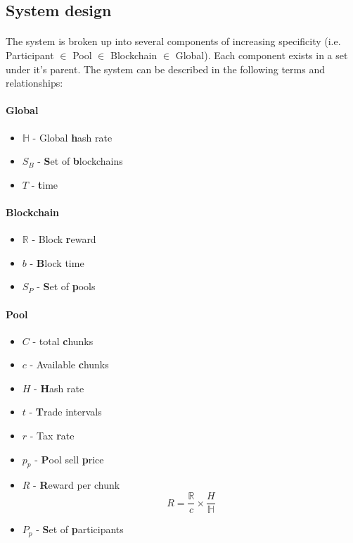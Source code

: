 \subsection{System design}

\paragraph{} The system is broken up into several components of increasing specificity (i.e. Participant $\in$ Pool $\in$ Blockchain $\in$ Global). Each component exists in a set under it's parent. The system can be described in the following terms and relationships:

\paragraph{Global} 

\begin{itemize}
  \item $\mathbb{H}$ - Global \textbf{h}ash rate
  \item $S_B$ - \textbf{S}et of \textbf{b}lockchains
  \item $T$ - \textbf{t}ime
\end{itemize}

\paragraph{Blockchain}

\begin{itemize}
  \item $\mathbb{R}$ - Block \textbf{r}eward
  \item $b$ - \textbf{B}lock time
  \item $S_P$ - \textbf{S}et of \textbf{p}ools
\end{itemize}

\paragraph{Pool}

\begin{itemize}
  \item $C$ - total \textbf{c}hunks
  \item $c$ - Available \textbf{c}hunks
  \item $H$ - \textbf{H}ash rate
  \item $t$ - \textbf{T}rade intervals 
  \item $r$ - Tax \textbf{r}ate
  \item $p_{p}$ - \textbf{P}ool sell \textbf{p}rice
  \item $R$ - \textbf{R}eward per chunk 
    \begin{equation} \label{equation:chunkreward}
      R = \frac{\mathbb{R}}{c} \times \frac{H}{\mathbb{H}}
    \end{equation}
  \item $P_p$ - \textbf{S}et of \textbf{p}articipants
\end{itemize}

